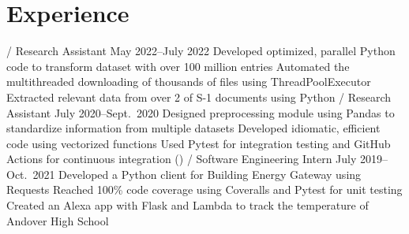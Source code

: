 \section{Experience}
\begin{doutline}
     / Research Assistant
    \hfill May 2022--July 2022
        \2 Developed optimized, parallel Python code to transform dataset with over 100 million entries
        \2 Automated the multithreaded downloading of thousands of files using ThreadPoolExecutor
        \2 Extracted relevant data from over 2  of  S-1 documents using Python
     / Research Assistant
    \hfill July 2020--Sept.\ 2020
        \2 Designed preprocessing module using Pandas to standardize information from multiple datasets
            \3 Developed idiomatic, efficient code using vectorized functions
            \3 Used Pytest for integration testing and GitHub Actions for continuous integration ()
     / Software Engineering Intern
    \hfill July 2019--Oct.\ 2021
        \2 Developed a Python client for Building Energy Gateway using Requests
            \3 Reached 100\% code coverage using Coveralls and Pytest for unit testing
        \2 Created an Alexa app with Flask and  Lambda to track the temperature of Andover High School
\end{doutline}

